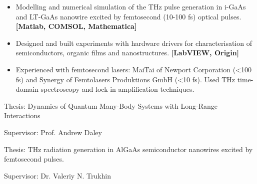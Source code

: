 \documentclass[10pt,a4paper,ragged2e,withhyper]{altacv}
\begin{document}
\divider


\begin{itemize}

    \item
    Modelling and numerical simulation of the THz pulse generation in i-GaAs and LT-GaAs
    nanowire excited by femtosecond (10-100 fs) optical pulses.
    {\bf [Matlab, COMSOL, Mathematica]}

    \item
    Designed and built experiments with hardware drivers for
    characterisation of semiconductors, organic films and nanostructures.
    {\bf [LabVIEW, Origin]}
    
    \item
    Experienced with femtosecond lasers: MaiTai of Newport Corporation (<100 fs)
    and Synergy of Femtolasers Produktions GmbH (<10 fs).
    Used THz time-domain spectroscopy and lock-in amplification techniques.

\end{itemize}



Thesis: Dynamics of Quantum Many-Body Systems with Long-Range Interactions

Supervisor: Prof. Andrew Daley

\divider


\divider


Thesis: THz radiation generation in AlGaAs semiconductor nanowires excited by femtosecond pulses.

Supervisor: Dr. Valeriy N. Trukhin

\end{document}
